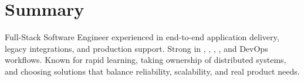 \section*{Summary}
\BigDivider
\noindent\newline
Full-Stack Software Engineer experienced in end-to-end application delivery, legacy integrations, and production support. Strong in , , , , and DevOps workflows. Known for rapid learning, taking ownership of distributed systems, and choosing solutions that balance reliability, scalability, and real product needs.
